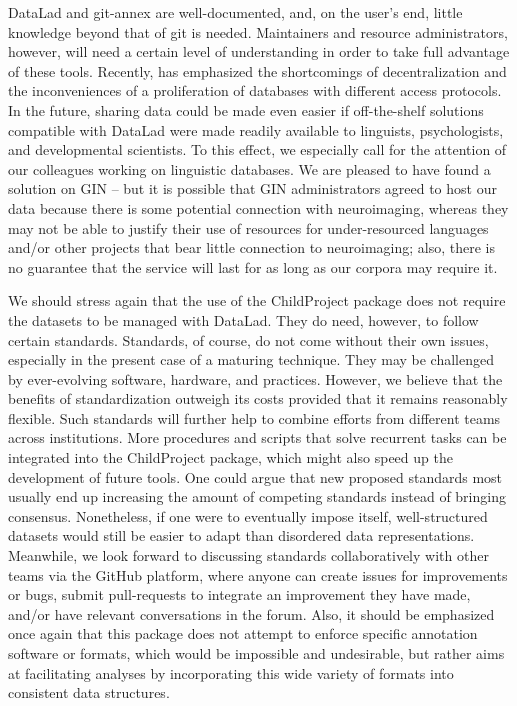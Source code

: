 \documentclass[smallextended]{svjour3}       %
\begin{document}
DataLad and git-annex are well-documented, and, on the user's end, little knowledge beyond that of git is needed. Maintainers and resource administrators, however, will need a certain level of understanding in order to take full advantage of these tools.
Recently, \citet{Powell2021} has emphasized the shortcomings of decentralization and the inconveniences of a proliferation of databases with different access protocols. In the future, sharing data could be made even easier if off-the-shelf solutions compatible with DataLad were made readily available to linguists, psychologists, and developmental scientists. To this effect, we especially call for the attention of our colleagues working on linguistic databases. We are pleased to have found a solution on GIN -- but it is possible that GIN administrators agreed to host our data because there is some potential connection with neuroimaging, whereas they may not be able to justify their use of resources for under-resourced languages and/or other projects that bear little connection to neuroimaging; also, there is no guarantee that the service will last for as long as our corpora may require it.

We should stress again that the use of the ChildProject package does not require the datasets to be managed with DataLad. They do need, however, to follow certain standards. Standards, of course, do not come without their own issues, especially in the present case of a maturing technique. They may be challenged by ever-evolving software, hardware, and practices. However, we believe that the benefits of standardization outweigh its costs provided that it remains reasonably flexible. Such standards will further help to combine efforts from different teams across institutions. More procedures and scripts that solve recurrent tasks can be integrated into the ChildProject package, which might also speed up the development of future tools. 
One could argue that new proposed standards most usually end up increasing the amount of competing standards instead of bringing consensus. Nonetheless, if one were to eventually impose itself, well-structured datasets would still be easier to adapt than disordered data representations. Meanwhile, we look forward to discussing standards collaboratively with other teams via the GitHub platform, where anyone can create issues for improvements or bugs, submit pull-requests to integrate an improvement they have made, and/or have relevant conversations in the forum. Also, it should be emphasized once again that this package does not attempt to enforce specific annotation software or formats, which would be impossible and undesirable, but rather aims at facilitating analyses by incorporating this wide variety of formats into consistent data structures.
\end{document}
